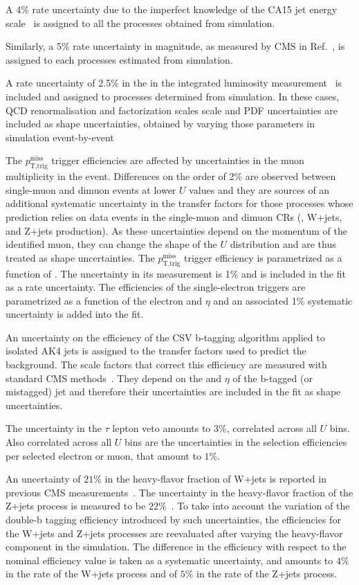 A 4\% rate uncertainty due to the imperfect knowledge of the CA15 jet energy scale~\cite{jec} is assigned to all the processes obtained from simulation.

Similarly, a 5\% rate uncertainty in \ptmiss magnitude, as measured by CMS in Ref.~\cite{Khachatryan:2014gga}, is assigned to each processes estimated from simulation.

A rate uncertainty of 2.5\% in the in the integrated luminosity measurement~\cite{CMS-PAS-LUM-17-001} is included and assigned to processes determined from simulation. In these cases, QCD renormalisation and factorization scales scale and PDF uncertainties are included as shape uncertainties, obtained by varying those parameters in simulation event-by-event

The $p_\text{T,trig}^\text{miss}$ trigger efficiencies are affected by uncertainties in the muon multiplicity in the event.  Differences on the order of 2\% are observed between single-muon and dimuon events at lower $U$ values and they are sources of an additional systematic uncertainty in the transfer factors for those processes whose prediction relies on data events in the single-muon and
dimuon CRs (\ttbar, W+jets, and Z+jets production). As these uncertainties depend on the momentum of the identified muon, they can change the shape of the $U$ distribution and are thus treated as shape uncertainties. The $p_\text{T,trig}^\text{miss}$ trigger efficiency is parametrized as a function of \ptmiss. The uncertainty in its measurement is 1\% and is included in the fit as a rate uncertainty.
The efficiencies of the single-electron triggers are parametrized as a function of the electron \pt and $\eta$ and an associated 1\% systematic uncertainty is added into the fit.

An uncertainty on the efficiency of the CSV b-tagging algorithm applied to isolated AK4 jets is assigned to the transfer factors used to predict the \ttbar background. The scale factors that correct this efficiency are measured with standard CMS methods~\cite{Sirunyan:2017ezt}. They depend on the \pt and $\eta$ of the b-tagged (or mistagged) jet and therefore their uncertainties are included in the fit as shape uncertainties.

The uncertainty in the $\tau$ lepton veto amounts to $3\%$, correlated across all $U$ bins. Also correlated across all $U$ bins are the uncertainties in the selection efficiencies per selected electron or muon, that amount to $1\%$.

An uncertainty of $21\%$ in the heavy-flavor fraction of W+jets is reported in previous CMS measurements~\cite{Khachatryan:2014uva,Chatrchyan:2013uza}. The uncertainty in the heavy-flavor fraction of the Z+jets process is measured to be $22\%$~\cite{Khachatryan:2014zya,Chatrchyan:2014dha}. To take into account the variation of the double-b tagging efficiency introduced by such uncertainties, the efficiencies for the W+jets and Z+jets processes are reevaluated after varying the heavy-flavor component in the simulation. The difference in the efficiency with respect to the nominal efficiency value is taken as a systematic uncertainty, and amounts to $4\%$ in the rate of the W+jets process and of $5\%$ in the rate of the Z+jets process. 

